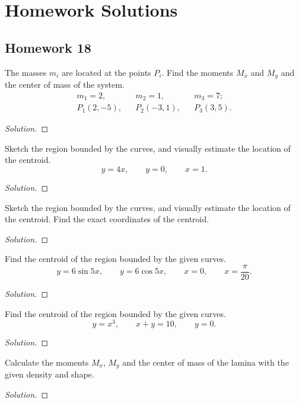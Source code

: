 \chapter{Homework Solutions}
\section{Homework 18}
\begin{problem}
The masses $m_i$ are located at the points $P_i$. Find the moments $M_x$
and $M_y$ and the center of mass of the system.
\begin{align*}
m_1=2,&&m_2=1,&&m_3=7;\\
P_1(2,-5),&&P_2(-3,1),&&P_3(3,5).
\end{align*}
\end{problem}
\begin{proof}[Solution]
\end{proof}

\begin{problem}
Sketch the region bounded by the curves, and visually estimate the location
of the centroid.
\[
y=4x,\qquad y=0,\qquad x=1.
\]
\end{problem}
\begin{proof}[Solution]
\end{proof}

\begin{problem}
Sketch the region bounded by the curves, and visually estimate the location
of the centroid. Find the exact coordinates of the centroid.
\end{problem}
\begin{proof}[Solution]
\end{proof}

\begin{problem}
Find the centroid of the region bounded by the given curves.
\[
y=6\sin 5x,\qquad
y=6\cos 5x,\qquad
x=0,\qquad
x=\frac{\pi}{20}.
\]
\end{problem}
\begin{proof}[Solution]
\end{proof}

\begin{problem}
Find the centroid of the region bounded by the given curves.
\[
y=x^3,\qquad
x+y=10,\qquad
y=0.
\]
\end{problem}
\begin{proof}[Solution]
\end{proof}

\begin{problem}
Calculate the moments $M_x$, $M_y$ and the center of mass of the lamina
with the given density and shape.
\end{problem}
\begin{proof}[Solution]
\end{proof}

